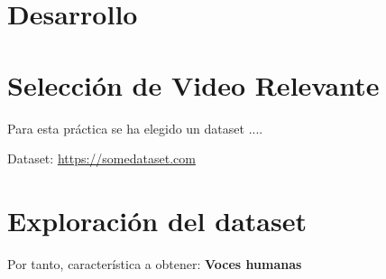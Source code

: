 \section {Desarrollo}

\section{Selección de Video Relevante}
Para esta práctica se ha elegido un dataset ....

Dataset: \url{https://somedataset.com}

\section{Exploración del dataset}
Por tanto, característica a obtener: \textbf{Voces humanas}
